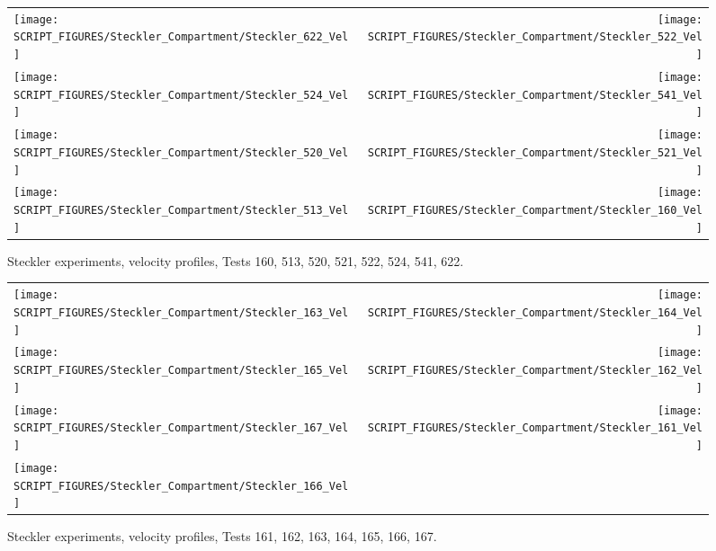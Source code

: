 \begin{figure}[p]
\begin{tabular*}{\textwidth}{l@{\extracolsep{\fill}}r}
\texttt{[image: SCRIPT\_FIGURES/Steckler\_Compartment/Steckler\_622\_Vel]} &
\texttt{[image: SCRIPT\_FIGURES/Steckler\_Compartment/Steckler\_522\_Vel]} \\
\texttt{[image: SCRIPT\_FIGURES/Steckler\_Compartment/Steckler\_524\_Vel]} &
\texttt{[image: SCRIPT\_FIGURES/Steckler\_Compartment/Steckler\_541\_Vel]} \\
\texttt{[image: SCRIPT\_FIGURES/Steckler\_Compartment/Steckler\_520\_Vel]} &
\texttt{[image: SCRIPT\_FIGURES/Steckler\_Compartment/Steckler\_521\_Vel]} \\
\texttt{[image: SCRIPT\_FIGURES/Steckler\_Compartment/Steckler\_513\_Vel]} &
\texttt{[image: SCRIPT\_FIGURES/Steckler\_Compartment/Steckler\_160\_Vel]}
\end{tabular*}
\caption[Steckler experiments, velocity profiles, Tests 160, 513, 520, 521, 522, 524, 541, 622]{Steckler experiments, velocity profiles, Tests 160, 513, 520, 521, 522, 524, 541, 622.}
\label{Steckler_Vel_6}
\end{figure}

\begin{figure}[p]
\begin{tabular*}{\textwidth}{l@{\extracolsep{\fill}}r}
\texttt{[image: SCRIPT\_FIGURES/Steckler\_Compartment/Steckler\_163\_Vel]} &
\texttt{[image: SCRIPT\_FIGURES/Steckler\_Compartment/Steckler\_164\_Vel]} \\
\texttt{[image: SCRIPT\_FIGURES/Steckler\_Compartment/Steckler\_165\_Vel]} &
\texttt{[image: SCRIPT\_FIGURES/Steckler\_Compartment/Steckler\_162\_Vel]} \\
\texttt{[image: SCRIPT\_FIGURES/Steckler\_Compartment/Steckler\_167\_Vel]} &
\texttt{[image: SCRIPT\_FIGURES/Steckler\_Compartment/Steckler\_161\_Vel]} \\
\texttt{[image: SCRIPT\_FIGURES/Steckler\_Compartment/Steckler\_166\_Vel]} &
\end{tabular*}
\caption[Steckler experiments, velocity profiles, Tests 161, 162, 163, 164, 165, 166, 167]{Steckler experiments, velocity profiles, Tests 161, 162, 163, 164, 165, 166, 167.}
\label{Steckler_Vel_7}
\end{figure}


\clearpage

